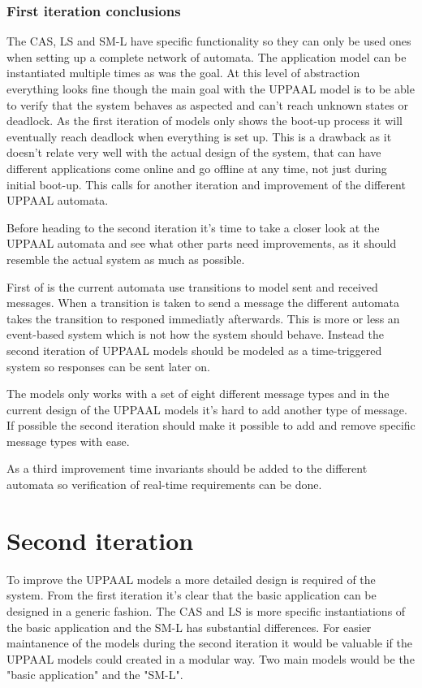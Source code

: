 \subsubsection{First iteration conclusions}
The CAS, LS and SM-L have specific functionality so they can only be used ones
when setting up a complete network of automata. The application model can be
instantiated multiple times as was the goal. At this level of abstraction
everything looks fine though the main goal with the UPPAAL model is to be able
to verify that the system behaves as aspected and can't reach unknown states or
deadlock. As the first iteration of models only shows the boot-up process it
will eventually reach deadlock when everything is set up. This is a drawback
as it doesn't relate very well with the actual design of the system, that can
have different applications come online and go offline at any time, not just
during initial boot-up. This calls for another iteration and improvement of the
different UPPAAL automata.

Before heading to the second iteration it's time to take a closer look at the
UPPAAL automata and see what other parts need improvements, as it should
resemble the actual system as much as possible.

First of is the current automata use transitions to model sent and
received messages. When a transition is taken to send a message the different
automata takes the transition to responed immediatly afterwards. This is more
or less an event-based system which is not how the system should behave.
Instead the second iteration of UPPAAL models should be modeled as a
time-triggered system so responses can be sent later on.

The models only works with a set of eight different message types and in the
current design of the UPPAAL models it's hard to add another type of message.
If possible the second iteration should make it possible to add and remove
specific message types with ease.

As a third improvement time invariants should be added to the different
automata so verification of real-time requirements can be done.

\section{Second iteration}
To improve the UPPAAL models a more detailed design is required of the system.
From the first iteration it's clear that the basic application can be designed
in a generic fashion. The CAS and LS is more specific instantiations of the
basic application and the SM-L has substantial differences. For easier
maintanence of the models during the second iteration it would be valuable if
the UPPAAL models could created in a modular way. Two main models would be the
"basic application" and the "SM-L".

